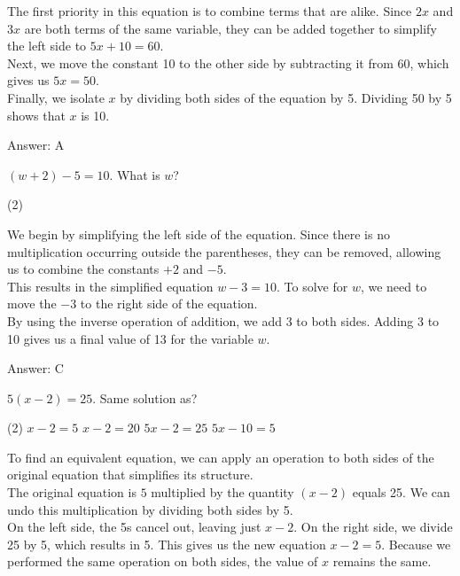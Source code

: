 \documentclass[11pt,paper=a4,answers]{exam}
\begin{document}
\begin{questions}
\begin{solution}
The first priority in this equation is to combine terms that are alike. Since $2x$ and $3x$ are both terms of the same variable, they can be added together to simplify the left side to $5x + 10 = 60$. 
\\[10pt]
Next, we move the constant 10 to the other side by subtracting it from 60, which gives us $5x = 50$. 
\\[10pt]
Finally, we isolate $x$ by dividing both sides of the equation by 5. Dividing 50 by 5 shows that $x$ is 10.

\vspace{15pt}
Answer: \colorbox{yellow!100}{A}
\end{solution}

\question
$(w + 2) - 5 = 10$. What is $w$?
\begin{tasks}(2)
\end{tasks}

\begin{solution}
We begin by simplifying the left side of the equation. Since there is no multiplication occurring outside the parentheses, they can be removed, allowing us to combine the constants $+2$ and $-5$. 
\\[10pt]
This results in the simplified equation $w - 3 = 10$. To solve for $w$, we need to move the $-3$ to the right side of the equation. 
\\[10pt]
By using the inverse operation of addition, we add 3 to both sides. Adding 3 to 10 gives us a final value of 13 for the variable $w$.

\vspace{15pt}
Answer: \colorbox{yellow!100}{C}
\end{solution}

\question
$5(x - 2) = 25$. Same solution as?
\begin{tasks}(2)
    \task $x - 2 = 5$
    \task $x - 2 = 20$
    \task $5x - 2 = 25$
    \task $5x - 10 = 5$
\end{tasks}

\begin{solution}
To find an equivalent equation, we can apply an operation to both sides of the original equation that simplifies its structure. 
\\[10pt]
The original equation is $5$ multiplied by the quantity $(x - 2)$ equals 25. We can undo this multiplication by dividing both sides by 5. 
\\[10pt]
On the left side, the 5s cancel out, leaving just $x - 2$. On the right side, we divide 25 by 5, which results in 5. This gives us the new equation $x - 2 = 5$. Because we performed the same operation on both sides, the value of $x$ remains the same.


\end{solution}
\end{questions}
\end{document}
